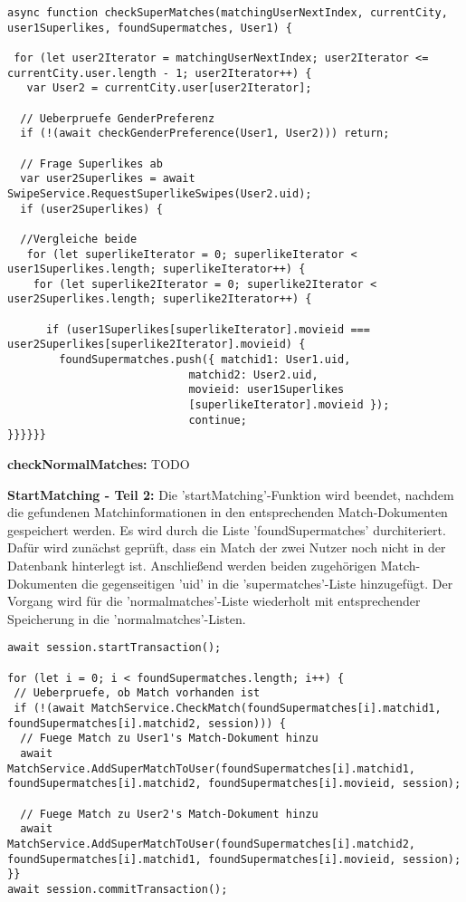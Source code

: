 \begin{lstlisting}[caption=matchManager.js - checkSuperMatches, label=lst:checkSuperMatches]
async function checkSuperMatches(matchingUserNextIndex, currentCity, user1Superlikes, foundSupermatches, User1) {

 for (let user2Iterator = matchingUserNextIndex; user2Iterator <= currentCity.user.length - 1; user2Iterator++) {
   var User2 = currentCity.user[user2Iterator];
   
  // Ueberpruefe GenderPreferenz
  if (!(await checkGenderPreference(User1, User2))) return;
  
  // Frage Superlikes ab
  var user2Superlikes = await SwipeService.RequestSuperlikeSwipes(User2.uid);
  if (user2Superlikes) {
        
  //Vergleiche beide
   for (let superlikeIterator = 0; superlikeIterator < user1Superlikes.length; superlikeIterator++) {
    for (let superlike2Iterator = 0; superlike2Iterator < user2Superlikes.length; superlike2Iterator++) {
    
      if (user1Superlikes[superlikeIterator].movieid === user2Superlikes[superlike2Iterator].movieid) {
        foundSupermatches.push({ matchid1: User1.uid,
                            matchid2: User2.uid, 
                            movieid: user1Superlikes
                            [superlikeIterator].movieid });
                            continue;
}}}}}}
\end{lstlisting}

\noindent
{}
\textbf{checkNormalMatches:}
TODO

\noindent
{}
\textbf{StartMatching - Teil 2:}
Die 'startMatching'-Funktion wird beendet, nachdem die gefundenen Matchinformationen in den entsprechenden Match-Dokumenten gespeichert werden. Es wird durch die Liste 'foundSupermatches' durchiteriert. Dafür wird zunächst geprüft, dass ein Match der zwei Nutzer noch nicht in der Datenbank hinterlegt ist. Anschließend werden beiden zugehörigen Match-Dokumenten die gegenseitigen 'uid' in die 'supermatches'-Liste hinzugefügt.
Der Vorgang wird für die 'normalmatches'-Liste wiederholt mit entsprechender Speicherung in die 'normalmatches'-Listen.

\begin{lstlisting}[caption=matchManager.js - startMatching - Teil 2: Speichere Matches, label=lst:startMatchingteil2]
await session.startTransaction();

for (let i = 0; i < foundSupermatches.length; i++) {        
 // Ueberpruefe, ob Match vorhanden ist
 if (!(await MatchService.CheckMatch(foundSupermatches[i].matchid1,   foundSupermatches[i].matchid2, session))) {
  // Fuege Match zu User1's Match-Dokument hinzu
  await MatchService.AddSuperMatchToUser(foundSupermatches[i].matchid1, foundSupermatches[i].matchid2, foundSupermatches[i].movieid, session);

  // Fuege Match zu User2's Match-Dokument hinzu
  await MatchService.AddSuperMatchToUser(foundSupermatches[i].matchid2,  foundSupermatches[i].matchid1, foundSupermatches[i].movieid, session);
}}
await session.commitTransaction();
\end{lstlisting}